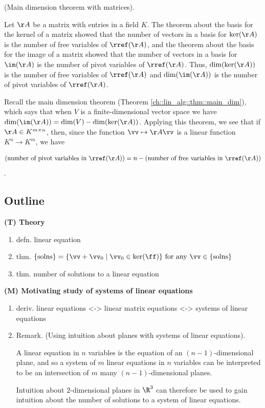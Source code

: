 \begin{deriv}
    (Main dimension theorem with matrices).

    Let $\AA$ be a matrix with entries in a field $K$. The theorem about the basis for the kernel of a matrix showed that the number of vectors in a basis for $\ker(\AA)$ is the number of free variables of $\rref(\AA)$, and the theorem about the basis for the image of a matrix showed that the number of vectors in a basis for $\im(\AA)$ is the number of pivot variables of $\rref(\AA)$. Thus, $\dim(\ker(\AA))$ is the number of free variables of $\rref(\AA)$ and $\dim(\im(\AA))$ is the number of pivot variables of $\rref(\AA)$.
    
    Recall the main dimension theorem (Theorem \ref{ch::lin_alg::thm::main_dim}), which says that when $V$ is a finite-dimensional vector space we have $\dim(\im(\AA)) = \dim(V) - \dim(\ker(\AA))$. Applying this theorem, we see that if $\AA \in K^{m \times n}$, then, since the function $\vv \mapsto \AA \vv$ is a linear function $K^n \rightarrow K^m$, we have

    \begin{align*}
        (\text{number of pivot variables in $\rref(\AA)$}) = n - (\text{number of free variables in $\rref(\AA)$})
    \end{align*}.
\end{deriv}

\newpage

\subsection*{Outline}

\textbf{(T) Theory}
\begin{enumerate}
    \item defn. linear equation
    \item thm. $\{\text{solns}\} = \{ \vv + \vv_0 \mid \vv_0 \in \ker(\ff) \} \text{ for any $\vv \in \{\text{solns}\}$}$
    \item thm. number of solutions to a linear equation
\end{enumerate}

\textbf{(M) Motivating study of systems of linear equations}
\begin{enumerate}
    \item deriv. linear equations <-> linear matrix equations <-> systems of linear equations
    \item Remark. (Using intuition about planes with systems of linear equations). 
    
  	A linear equation in $n$ variables is the equation of an $(n - 1)$-dimensional plane, and so a system of $m$ linear equations in $n$ variables can be interpreted to be an intersection of $m$ many $(n - 1)$-dimensional planes.

    Intuition about $2$-dimensional planes in $\R^3$ can therefore be used to gain intuition about the number of solutions to a system of linear equations.
\end{enumerate}

